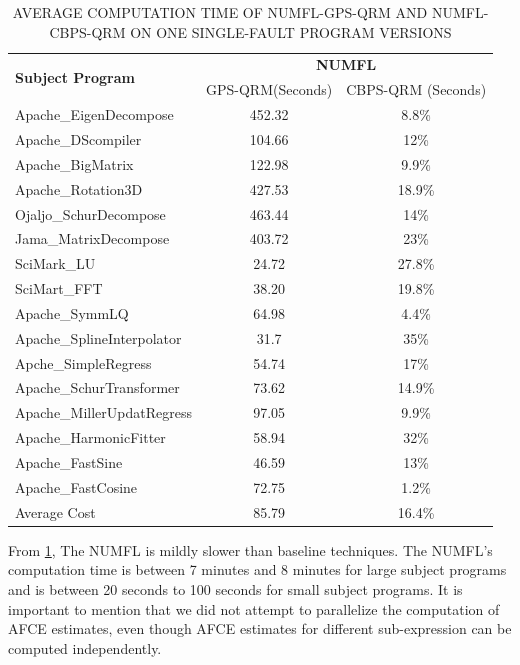 \documentclass[times]{stvrauth}
\begin{document}
\begin{table}[htbp!]
\caption{AVERAGE COMPUTATION TIME OF NUMFL-GPS-QRM AND NUMFL-CBPS-QRM ON ONE SINGLE-FAULT PROGRAM VERSIONS }
\label{computetime}
\centering
      \begin{tabular}{|l|c|c|}
      \hline
\multirow{2}{*}{{\bf Subject Program}}	&	\multicolumn{2}{|c|}{{\bf NUMFL}}	\\	\cline{2-3}
  &  GPS-QRM(Seconds) &CBPS-QRM (Seconds)\\ \hline
Apache\_EigenDecompose	&	452.32	&	8.8\%	\\	\hline
Apache\_DScompiler	&	104.66	&	12\%	\\	\hline
Apache\_BigMatrix	&	122.98	&	9.9\%	\\	\hline
Apache\_Rotation3D	&	427.53	&	18.9\%	\\	\hline
Ojaljo\_SchurDecompose	&	463.44	&	14\%	\\	\hline
Jama\_MatrixDecompose	&	403.72	&	23\%	\\	\hline
SciMark\_LU	&	24.72	&	27.8\%	\\	\hline
SciMart\_FFT	&	38.20	&	19.8\%	\\	\hline
Apache\_SymmLQ	&	64.98	&	4.4\%	\\	\hline
Apache\_SplineInterpolator	&	31.7	&	35\%	\\	\hline
Apche\_SimpleRegress	&	54.74	&	17\%	\\	\hline
Apache\_SchurTransformer	&	73.62	&	14.9\%	\\	\hline
Apache\_MillerUpdatRegress	&	97.05	&	9.9\%	\\	\hline
Apache\_HarmonicFitter	&	58.94	&	32\%	\\	\hline
Apache\_FastSine	&	46.59	&	13\%	\\	\hline
Apache\_FastCosine	&	72.75	&	1.2\%	\\	\hline
Average Cost	&	85.79	&	16.4\%	\\	\hline
\end{tabular}
\end{table}

From \ref{computetime}, The NUMFL is mildly slower than baseline techniques. The NUMFL's computation time is between 7 minutes and 8 minutes for large subject programs and is between  20 seconds to 100 seconds for small subject programs. It is important to mention that we did not attempt to parallelize the computation of AFCE estimates, even though AFCE estimates for different sub-expression can be computed independently.
\end{document}
